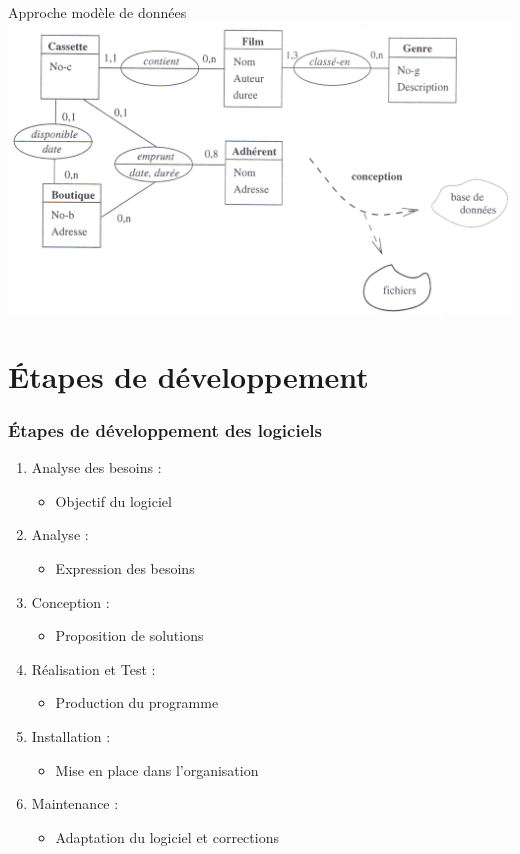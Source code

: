 \documentclass[14pt]{beamer}
\begin{document}
\begin{framentitle}{Approche modèle de données}
    \includegraphics[width=\textwidth]{fig3b.png}
\end{framentitle}

\section{Étapes de développement}
\begin{frame}
    \frametitle{Étapes de développement des logiciels}
    \begin{enumerate}
        \item Analyse des besoins :
            \begin{itemize}
                \item Objectif du logiciel
            \end{itemize}
        \item Analyse :
            \begin{itemize}
                \item Expression des besoins
            \end{itemize}
        \item Conception :
            \begin{itemize}
                \item Proposition de solutions
            \end{itemize}
        \item Réalisation et Test :
            \begin{itemize}
                \item Production du programme
            \end{itemize}
        \item Installation :
            \begin{itemize}
                \item Mise en place dans l'organisation
            \end{itemize}
        \item Maintenance :
            \begin{itemize}
                \item Adaptation du logiciel et corrections
            \end{itemize}
    \end{enumerate}
\end{frame}
\end{document}
